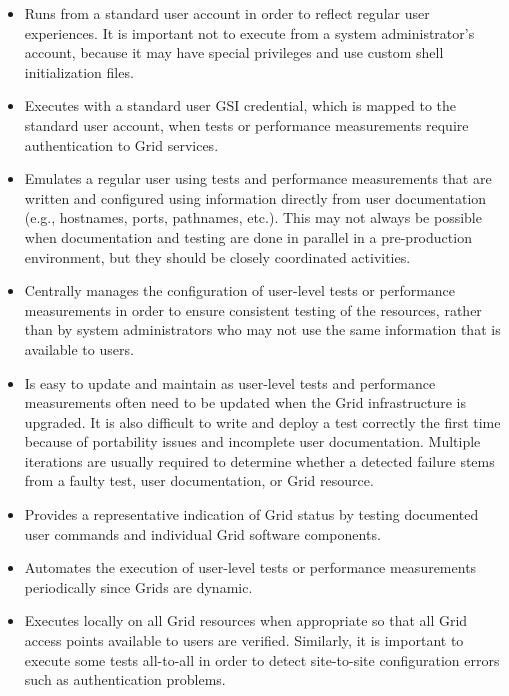 \documentclass[times,10pt,twocolumn]{article}
\begin{document}
\begin{itemize}

\item Runs from a standard user
account in order to reflect regular user experiences.  It is important not to execute from a system administrator's account,
because it may have special privileges and use custom shell initialization files.

\item Executes with a standard user GSI
credential, which is mapped to the standard user account, when tests or performance measurements require authentication to Grid services.

\item Emulates a regular user using tests and performance
measurements that are written and configured using information directly from user documentation
(e.g., hostnames, ports, pathnames, etc.). 
This may not always be possible
when documentation and testing are done in parallel in a pre-production
environment, but they should be closely coordinated activities. 

\item Centrally manages the configuration of user-level tests or performance measurements in order to ensure consistent testing of the resources, rather than
by system administrators who may not use the same information that is
available to users.

\item Is easy to update
and maintain as user-level tests and performance measurements often need
to be updated when the Grid infrastructure is upgraded.
It is also difficult to write and deploy a test correctly the first time
because of portability issues and incomplete user documentation.  Multiple
iterations are usually required to determine whether a detected failure stems
from a faulty test, user documentation, or Grid resource.  

\item Provides a representative indication of Grid status by testing
documented user commands and individual Grid software components.  

\item Automates the execution of user-level tests or performance measurements
periodically since Grids are dynamic.

\item Executes locally on all Grid
resources when appropriate so that all Grid access points available to users
are verified.  Similarly, it is important to execute some tests all-to-all
in order to detect site-to-site configuration errors such as authentication
problems.

\end{itemize}
\end{document}
